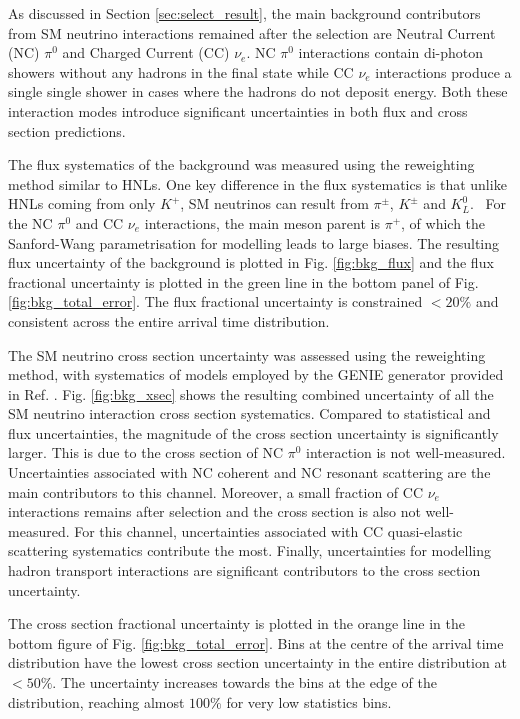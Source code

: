 As discussed in Section \ref{sec:select_result}, the main background contributors from SM neutrino interactions remained after the selection are Neutral Current (NC) $\pi^0$ and Charged Current (CC) $\nu_e$.
NC $\pi^0$ interactions contain di-photon showers without any hadrons in the final state while CC $\nu_e$ interactions produce a single single shower in cases where the hadrons do not deposit energy.  
Both these interaction modes introduce significant uncertainties in both flux and cross section predictions.

The flux systematics of the background was measured using the reweighting method similar to HNLs.
One key difference in the flux systematics is that unlike HNLs coming from only $K^+$, SM neutrinos can result from $\pi^\pm$, $K^\pm$ and $K^0_L$. %
\ For the NC $\pi^0$ and CC $\nu_e$ interactions, the main meson parent is $\pi^+$, of which the Sanford-Wang parametrisation for modelling leads to large biases.
The resulting flux uncertainty of the background is plotted in Fig. \ref{fig:bkg_flux} and the flux fractional uncertainty is plotted in the green line in the bottom panel of Fig. \ref{fig:bkg_total_error}.
The flux fractional uncertainty is constrained $<20 \%$ and consistent across the entire arrival time distribution.

The SM neutrino cross section uncertainty was assessed using the reweighting method, with systematics of models employed by the GENIE generator provided in Ref. \cite{genie_tune}.
Fig. \ref{fig:bkg_xsec} shows the resulting combined uncertainty of all the SM neutrino interaction cross section systematics.
Compared to statistical and flux uncertainties, the magnitude of the cross section uncertainty is significantly larger.
This is due to the cross section of NC $\pi^0$ interaction is not well-measured.  
Uncertainties associated with NC coherent and NC resonant scattering are the main contributors to this channel.
Moreover, a small fraction of CC $\nu_e$ interactions remains after selection and the cross section is also not well-measured.
For this channel, uncertainties associated with CC quasi-elastic scattering systematics contribute the most.
Finally, uncertainties for modelling hadron transport interactions are significant contributors to the cross section uncertainty.


The cross section fractional uncertainty is plotted in the orange line in the bottom figure of Fig. \ref{fig:bkg_total_error}.
Bins at the centre of the arrival time distribution have the lowest cross section uncertainty in the entire distribution at $< 50\%$.
The uncertainty increases towards the bins at the edge of the distribution, reaching almost $100 \%$ for very low statistics bins.


